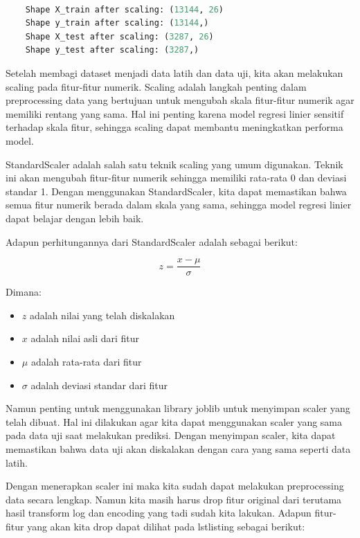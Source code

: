 \begin{lstlisting}[language=Python, caption=Shape Data Latih dan uji]

    Shape X_train after scaling: (13144, 26)
    Shape y_train after scaling: (13144,)
    Shape X_test after scaling: (3287, 26)
    Shape y_test after scaling: (3287,)
\end{lstlisting}

Setelah membagi dataset menjadi data latih dan data uji, kita akan melakukan scaling pada fitur-fitur numerik. Scaling adalah langkah penting dalam preprocessing data yang bertujuan untuk mengubah skala fitur-fitur numerik agar memiliki rentang yang sama. Hal ini penting karena model regresi linier sensitif terhadap skala fitur, sehingga scaling dapat membantu meningkatkan performa model.

StandardScaler adalah salah satu teknik scaling yang umum digunakan. Teknik ini akan mengubah fitur-fitur numerik sehingga memiliki rata-rata 0 dan deviasi standar 1. Dengan menggunakan StandardScaler, kita dapat memastikan bahwa semua fitur numerik berada dalam skala yang sama, sehingga model regresi linier dapat belajar dengan lebih baik.

\newpage
Adapun perhitungannya dari StandardScaler adalah sebagai berikut:

\begin{equation}
    z = \frac{x - \mu}{\sigma}
\end{equation}

Dimana:
\begin{itemize}
    \item \( z \) adalah nilai yang telah diskalakan
    \item \( x \) adalah nilai asli dari fitur
    \item \( \mu \) adalah rata-rata dari fitur
    \item \( \sigma \) adalah deviasi standar dari fitur
\end{itemize}

Namun penting untuk menggunakan library joblib untuk menyimpan scaler yang telah dibuat. Hal ini dilakukan agar kita dapat menggunakan scaler yang sama pada data uji saat melakukan prediksi. Dengan menyimpan scaler, kita dapat memastikan bahwa data uji akan diskalakan dengan cara yang sama seperti data latih.

Dengan menerapkan scaler ini maka kita sudah dapat melakukan preprocessing data secara lengkap. Namun kita masih harus drop fitur original dari terutama hasil transform log dan encoding yang tadi sudah kita lakukan. Adapun fitur-fitur yang akan kita drop dapat dilihat pada lstlisting sebagai berikut:

